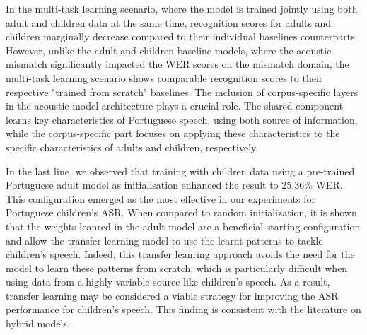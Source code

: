 In the multi-task learning scenario, where the model is trained jointly using both adult and children data at the same time, recognition scores for adults and children marginally decrease compared to their individual baselines counterparts. However, unlike the adult and children baseline models, where the acoustic mismatch significantly impacted the WER scores on the mismatch domain, the multi-task learning scenario shows comparable recognition scores to their respective "trained from scratch" baselines. The inclusion of corpus-specific layers in the acoustic model architecture plays a crucial role. The shared component learns key characteristics of Portuguese speech, using both source of information, while the corpus-specific part focuses on applying these characteristics to the specific characteristics of adults and children, respectively.


In the last line, we observed that training with children data using a pre-trained Portuguese adult model as initialisation enhanced the result to 25.36\% WER. This configuration emerged as the most effective in our experiments for Portuguese children's ASR. When compared to random initialization, it is shown that the weights leanred in the adult model are a beneficial starting configuration and allow the transfer learning model to use the learnt patterns to tackle children's speech. Indeed, this transfer leanring approach avoids the need for the model to learn these patterns from scratch, which is particularly difficult when using data from a highly variable source like children's speech. As a result, transfer learning may be considered a viable strategy for improving the ASR performance for children's speech. This finding is consistent with the literature on hybrid models\cite{TransferLF,TFchildren}. 





